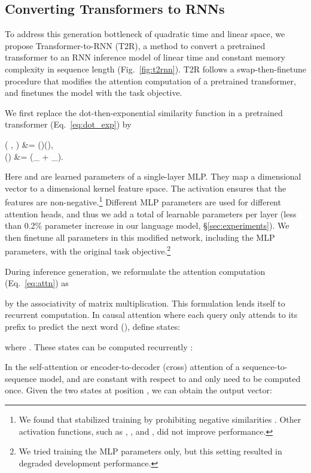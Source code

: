 \documentclass[11pt]{article}
\def\similarity{\mathrm{sim}}
\def\vphi{{\boldsymbol{\phi}}}
\def\vb{{\mathbf{b}}}
\def\vx{{\mathbf{x}}}
\def\vy{{\mathbf{y}}}
\def\mW{{\mathbf{W}}}
\newcommand{\relu}{{\operatorname{relu}}}
\newcommand{\TRNN}{T2R\xspace}
\begin{document}
\subsection{Converting Transformers to RNNs}
\label{sec:convert}
To address this generation bottleneck of quadratic time and linear space, we propose Transformer-to-RNN (\TRNN), a method to convert a pretrained transformer to an RNN inference model of linear time and constant memory complexity in sequence length (Fig.\ \ref{fig:t2rnn}).
\TRNN follows a swap-then-finetune procedure that modifies the attention computation of a pretrained transformer, and finetunes the model with the task objective.

We first replace the dot-then-exponential similarity function in a pretrained transformer (Eq.~\ref{eq:dot_exp}) by

\widetilde{\similarity} \left( \vx, \vy\right) 
&= \vphi\left(\vx\right)\cdot \vphi\left(\vy\right),\\
\vphi \left (\vx \right) &=  \relu\left(\mW_{\vphi} \vx + \vb_{\vphi}\right).

Here  and  are 
learned parameters
of a single-layer MLP.
They map a  dimensional vector to a  dimensional kernel feature space.
The  activation \cite{Fukushima1980} ensures that the features are non-negative.\footnote{We found that  stabilized training by prohibiting
negative similarities . Other activation functions, such as , , and , did not improve performance.} Different MLP parameters are used for different attention heads, and thus we add a total of  learnable parameters per layer (less than 0.2\% parameter increase in our language model, \S\ref{sec:experiments}).
We then finetune all parameters in this modified network, including the MLP parameters, with the original task objective.\footnote{We tried training the MLP parameters only, but this setting resulted in degraded development performance.}

During inference generation, we reformulate the attention computation (Eq.~\ref{eq:attn}) as

by the associativity of matrix multiplication. This formulation lends itself to recurrent computation.
In causal attention where each query only attends to its prefix to predict the next word (), define states:

where .
These states can be computed recurrently \cite{katharopoulos-et-al-2020}:

In the self-attention or encoder-to-decoder (cross) attention of a sequence-to-sequence model,  and  are constant with respect to  and only need to be computed once.
Given the two states at position , we can obtain the output vector: 
\end{document}
